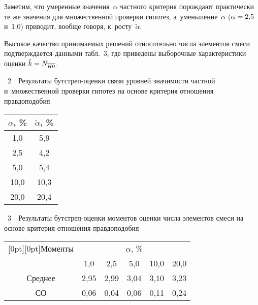 \begin{multicols}{2}
     Заметим, что умеренные значения~$\alpha$ частного критерия
порождают практически те же значения для множественной проверки гипотез,
а~уменьшение~$\alpha$ ($\alpha\hm= 2{,}5$ и~1,0) приводит, вообще говоря,
к~рос\-ту~$\tilde{\alpha}$.

     Высокое качество принимаемых решений относительно числа элементов
смеси подтверждается
 данными табл.~3, где приведены выборочные
характеристики оценки $\hat{k}\hm= N_{\overline{H0}}$.


{\begin{center} %

\vspace*{-1pt}

{\parbox{39mm}{{\tablename~2}\ \ \small{Результаты бут\-стреп-оцен\-ки связи уровней
значимости частной
и~множественной проверки гипотез на основе критерия отношения правдоподобия}}}

\vspace*{6pt}

{\small\tabcolsep=16pt
\begin{tabular}{|c|c|}
\hline
$\alpha$, \%& $\tilde{\alpha}$, \%\\
\hline
1,0& 5,9\\
2,5& 4,2\\
5,0& 5,4\\
10,0\hphantom{9}& 10,3\hphantom{9}\\
20,0\hphantom{9}&20,4\hphantom{9}\\
\hline
\end{tabular}}
\vspace*{-6pt}
\end{center}}



\addtocounter{table}{1}

\pagebreak

{\begin{center}
\vspace*{1pt}
{\parbox{68mm}{{\tablename~3}\ \ \small{Результаты бут\-стреп-оцен\-ки моментов оценки числа элементов смеси на
основе критерия отношения правдоподобия}}}

\vspace*{6pt}

{\small \begin{tabular}{|c|c|c|c|c|c|}
      \hline
      \multicolumn{1}{|c|}{\raisebox{-6pt}[0pt][0pt]{Моменты}} &\multicolumn{5}{c|}{$\alpha$, \%}\\
      \cline{2-6}
 &1,0&2,5&5,0&10,0&20,0\\
\hline
Среднее&2,95&2,99&3,04&3,10&3,23\\
СО&0,06&0,04&0,06&0,11&0,24\\
\hline
\end{tabular}}
\end{center}}


\end{multicols}
